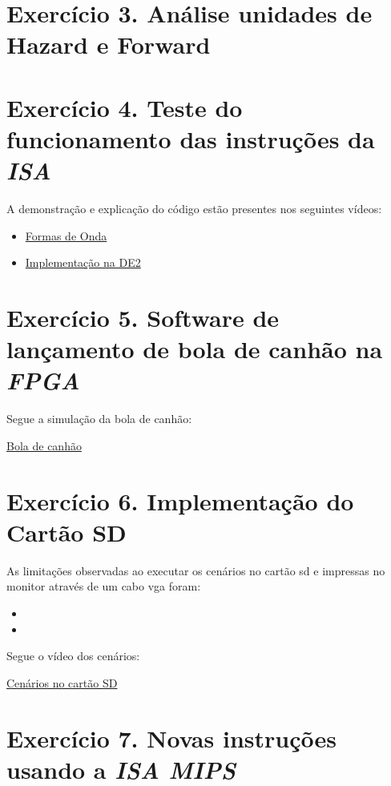 \documentclass[12pt]{article}
\begin{document}
\section{Exercício 3. Análise unidades de Hazard e Forward}
\label{sec:hazardforward}

\section{Exercício 4. Teste do funcionamento das instruções da \textit{ISA} }
\label{sec:testeisa}

A demonstração e explicação do código estão presentes nos seguintes vídeos:

\begin{itemize}
\item \href{https://youtu.be/u5eFv9_BDSw}{Formas de Onda}
\item \href{https://youtu.be/PA9af2_Dhi4}{Implementação na DE2} 
\end{itemize}


\section{Exercício 5. Software de lançamento de bola de canhão na \textit{FPGA}}
\label{sec:canhao}

Segue a simulação da bola de canhão:

\href{https://youtu.be/4IZcH5GzhVk}{Bola de canhão}


\section{Exercício 6. Implementação do Cartão SD}
\label{sec:cartaosd}

As limitações observadas ao executar os cenários no cartão sd e impressas no monitor através de um cabo vga foram:

\begin{itemize}
\item 
\item 
\end{itemize} 

Segue o vídeo dos cenários:

\href{https://youtu.be/VeoxltP3L6o}{Cenários no cartão SD}

  
\section{Exercício 7. Novas instruções usando a \textit{ISA MIPS}}
\label{sec:isamips} 
\end{document}
